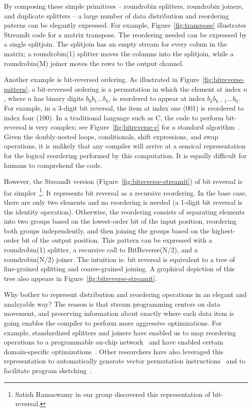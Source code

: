 By composing these simple primitives -- roundrobin splitters,
roundrobin joiners, and duplicate splitters -- a large number of data
distribution and reordering paterns can be elegantly expressed.  For
example, Figure~\ref{fig:transpose} illustrates StreamIt code for a
matrix transpose.  The reordering needed can be expressed by a single
splitjoin.  The splitjoin has an empty stream for every colum in the
matrix; a roundrobin(1) splitter moves the columns into the splitjoin,
while a roundrobin(M) joiner moves the rows to the output channel.

Another example is bit-reversed ordering.  As illustrated in
Figure~\ref{fig:bitreverse-pattern}, a bit-reversed ordering is a
permutation in which the element at index $n$, where $n$ has binary
digits $b_0b_1 \dots b_k$, is reordered to appear at index $b_kb_{k-1}
\dots b_0$.  For example, in a 3-digit bit reversal, the item at index
one (001) is reordered to index four (100).  In a traditional language
such as C, the code to perform bit-reversal is very complex; see
Figure~\ref{fig:bitreverse-c} for a standard
algorithm~\cite{press_numerical_1992}.  Given the doubly-nested loops,
conditionals, shift expressions, and swap operations, it is unlikely
that any compiler will arrive at a sensical representation for the
logical reordering performed by this computation.  It is equally
difficult for humans to comprehend the code.

However, the StreamIt version (Figure~\ref{fig:bitreverse-streamit})
of bit reversal is far simpler~\footnote{Satish Ramaswamy in our group
  discovered this representation of bit-reversal.}.  It represents bit
reversal as a recursive reordering.  In the base case, there are only
two elements and no reordering is needed (a 1-digit bit reversal is
the identity operation).  Otherwise, the reordering consists of
separating elements into two groups based on the lowest-order bit of
the input position, reordering both groups independently, and then
joining the groups based on the highest-order bit of the output
position.  This pattern can be expressed with a roundrobin(1)
splitter, a recursive call to BitReverse(N/2), and a roundrobin(N/2)
joiner.  The intuition is: bit reversal is equivalent to a tree of
fine-grained splitting and coarse-grained joining.  A graphical
depiction of this tree also appears in
Figure~\ref{fig:bitreverse-streamit}.

Why bother to represent distribution and reordering operations in an
elegant and analzyable way?  The reason is that stream programming
centers on data movement, and preserving information about exactly
where each data item is going enables the compiler to perform more
aggressive optimizations.  For example, standardized splitters and
joiners have enabled us to map reordering operations to a programmable
on-chip network~\cite{streamit-asplos} and have enabled certain
domain-specific
optimizations~\cite{lamb:pldi:2003,agrawal:cases:2005,techreport}.
Other researchers have also leveraged this representation to
automatically generate vector permutation
instructions~\cite{mani-permutations} and to facilitate program
sketching~\cite{bit-streaming}.

